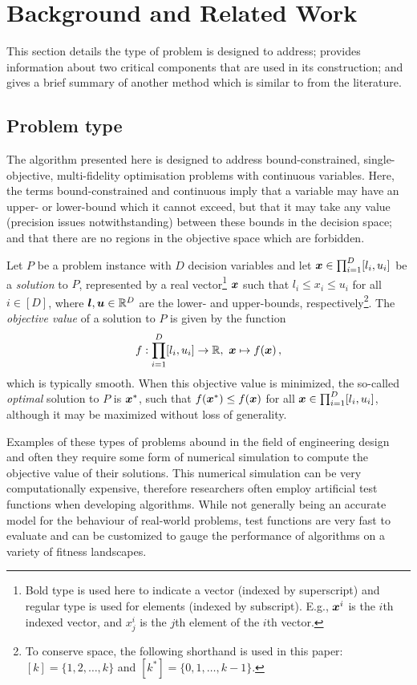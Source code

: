 \section{Background and Related Work}\label{sec:back}
This section details the type of problem \AlgName{} is designed to address; provides information about two critical components that are used in its construction; and gives a brief summary of another method which is similar to \AlgName{} from the literature.

\subsection{Problem type}
The algorithm presented here is designed to address bound-constrained, single-objective, multi-fidelity optimisation problems with continuous variables. Here, the terms bound-constrained and continuous imply that a variable may have an upper- or lower-bound which it cannot exceed, but that it may take any value (precision issues notwithstanding) between these bounds in the decision space; and that there are no regions in the objective space which are forbidden. 

Let $P$ be a problem instance with $D$ decision variables and let $\boldsymbol{x} \in \prod^D_{i=1}[l_i,u_i]$ be a \emph{solution} to $P$, represented by a real vector\footnote{Bold type is used here to indicate a vector (indexed by superscript) and regular type is used for elements (indexed by subscript). E.g., $\boldsymbol{x}^i$ is the $i$th indexed vector, and $x_j^i$ is the $j$th element of the $i$th vector.} $\boldsymbol{x}$ such that $l_i \le x_i \le u_i$ for all ${i \in [D]}$, where $\boldsymbol{l},\boldsymbol{u} \in \mathbb{R}^D$ are the lower- and upper-bounds, respectively\footnote{To conserve space, the following shorthand is used in this paper: ${[k] = \{1,2,\dots,k\}}$ and $[k^*] = \{0,1,\dots,k-1\}$.}. The \emph{objective value} of a solution to $P$ is given by the function
\begin{equation}
f:\displaystyle\prod^D_{i=1}[l_i,u_i]\to \mathbb{R},\ \boldsymbol{x} \mapsto f(\boldsymbol{x})\,, \label{eq:objective}
\end{equation}
which is typically smooth. When this objective value is minimized, the so-called \emph{optimal} solution to $P$ is $\boldsymbol{x}^*$, such that $f(\boldsymbol{x}^*) \leq f(\boldsymbol{x})$ for all $\boldsymbol{x} \in \prod^D_{i=1}[l_i,u_i]$, although it may be maximized without loss of generality.

Examples of these types of problems abound in the field of engineering design~\cite{deb2012optimization,forrester2008engineering} and often they require some form of numerical simulation to compute the objective value of their solutions. This numerical simulation can be very computationally expensive, therefore researchers often employ artificial test functions when developing algorithms. While not generally being an accurate model for the behaviour of real-world problems, test functions are very fast to evaluate and can be customized to gauge the performance of algorithms on a variety of fitness landscapes.

